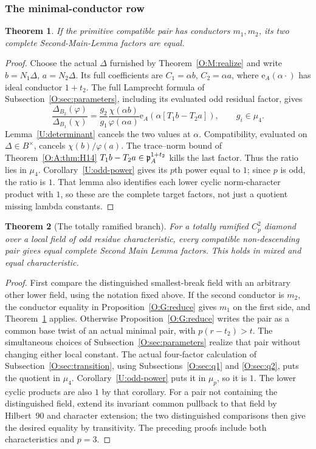 \documentclass[11pt]{amsart}
\newtheorem{theorem}{Theorem}[section]
\theoremstyle{definition}
\theoremstyle{remark}
\newcommand{\ee}{\mathrm e}\newcommand{\echar}{\mathrm e}\newcommand{\FF}{\mathbf F}
\begin{document}
\subsubsection*{The minimal-conductor row}
\begin{theorem}\label{O:G:minimal}
If the primitive compatible pair has conductors
$m_1,m_2$, its two complete Second-Main-Lemma factors are equal.
\end{theorem}
\begin{proof}
Choose the actual $\Delta$ furnished by Theorem~\ref{O:M:realize} and write
$b=N_1\Delta$, $a=N_2\Delta$. Its full coefficients are
$C_1=\alpha b$, $C_2=\alpha a$, where
$\ee_A(\alpha\cdot)$ has ideal conductor $1+t_2$.
The full Lamprecht formula of Subsection~\ref{O:sec:parameters}, including its evaluated odd
residual factor, gives
\[
 \frac{\Delta_{B_2}(\varphi)}{\Delta_{B_1}(\chi)}
 =\frac{g_2}{g_1}\frac{\chi(\alpha b)}{\varphi(\alpha a)}
  \ee_A\left(\alpha[T_1b-T_2a]\right),\qquad g_i\in\mu_4.
\]
Lemma~\ref{U:determinant} cancels the two values at $\alpha$.
Compatibility, evaluated on $\Delta\in B^\times$, cancels
$\chi(b)/\varphi(a)$. The trace--norm bound of Theorem~\ref{O:A:thm:H14}
$T_1b-T_2a\in\mathfrak p_A^{1+t_2}$ kills the last factor.
Thus the ratio lies in $\mu_4$.
Corollary~\ref{U:odd-power} gives its $p$th power equal to $1$; since $p$ is
odd, the ratio is $1$. That lemma also identifies each lower cyclic
norm-character product with $1$, so these are the complete target
factors, not just a quotient missing lambda constants.
\end{proof}
\begin{theorem}[The totally ramified branch]\label{O:G:totalbranch}
For a totally ramified $C_p^2$ diamond over a local field of odd residue
characteristic, every compatible non-descending pair gives equal complete
Second Main Lemma factors. This holds in mixed and equal characteristic.
\end{theorem}
\begin{proof}
First compare the distinguished smallest-break field with an arbitrary
other lower field, using the notation fixed above. If the second
conductor is $m_2$, the conductor equality in
Proposition~\ref{O:G:reduce} gives $m_1$ on the first side, and
Theorem~\ref{O:G:minimal} applies. Otherwise Proposition~\ref{O:G:reduce} writes the
pair as a common base twist of an actual minimal pair, with
$p(r-t_2)>t$. The simultaneous choices of Subsection~\ref{O:sec:parameters}
realize that pair without changing either local constant. The actual
four-factor calculation of Subsection~\ref{O:sec:transition}, using
Subsections~\ref{O:sec:q1} and \ref{O:sec:q2}, puts the quotient in $\mu_4$.
Corollary~\ref{U:odd-power} puts it in $\mu_p$, so it is $1$. The lower cyclic
products are also $1$ by that corollary. For a pair not containing the
distinguished field, extend its invariant common pullback to that field
by Hilbert~90 and character extension; the two distinguished comparisons
then give the desired equality by transitivity. The preceding proofs
include both characteristics and $p=3$.
\end{proof}
\end{document}
